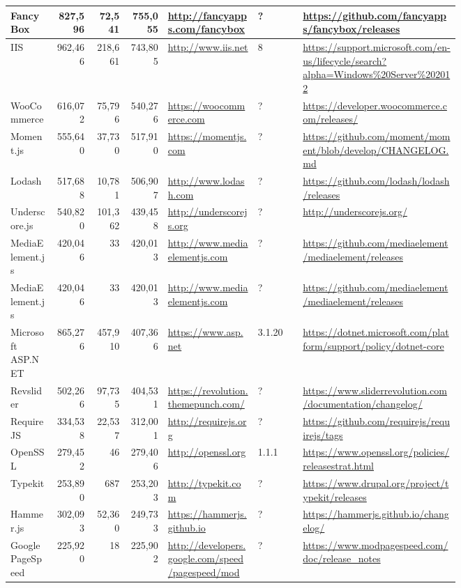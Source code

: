 \begin{landscape}
\begin{longtable}{|p{0.1\linewidth}|r|r|r|p{0.2\linewidth}|p{0.1\linewidth}|p{0.35\linewidth}|}
		FancyBox &827,596 &72,541 &755,055 &\url{http://fancyapps.com/fancybox} &? &\url{https://github.com/fancyapps/fancybox/releases} \\\hline
		IIS &962,466 &218,661 &743,805 &\url{http://www.iis.net} &8 &\url{https://support.microsoft.com/en-us/lifecycle/search?alpha=Windows\%20Server\%202012} \\\hline
		WooCommerce &616,072 &75,796 &540,276 &\url{https://woocommerce.com} &? &\url{https://developer.woocommerce.com/releases/} \\\hline
		Moment.js &555,640 &37,730 &517,910 &\url{https://momentjs.com} &? &\url{https://github.com/moment/moment/blob/develop/CHANGELOG.md} \\\hline
		Lodash &517,688 &10,781 &506,907 &\url{http://www.lodash.com} &? &\url{https://github.com/lodash/lodash/releases} \\\hline
		Underscore.js &540,820 &101,362 &439,458 &\url{http://underscorejs.org} &? &\url{http://underscorejs.org/} \\\hline
		MediaElement.js &420,046 &33 &420,013 &\url{http://www.mediaelementjs.com} &? &\url{https://github.com/mediaelement/mediaelement/releases} \\\hline
		MediaElement.js &420,046 &33 &420,013 &\url{http://www.mediaelementjs.com} &? &\url{https://github.com/mediaelement/mediaelement/releases} \\\hline
		Microsoft ASP.NET &865,276 &457,910 &407,366 &\url{https://www.asp.net} &3.1.20 &\url{https://dotnet.microsoft.com/platform/support/policy/dotnet-core} \\\hline
		Revslider &502,266 &97,735 &404,531 &\url{https://revolution.themepunch.com/} &? &\url{https://www.sliderrevolution.com/documentation/changelog/} \\\hline
		RequireJS &334,538 &22,537 &312,001 &\url{http://requirejs.org} &? &\url{https://github.com/requirejs/requirejs/tags} \\\hline
		OpenSSL &279,452 &46 &279,406 &\url{http://openssl.org} &1.1.1 &\url{https://www.openssl.org/policies/releasestrat.html} \\\hline
		Typekit &253,890 &687 &253,203 &\url{http://typekit.com} &? &\url{https://www.drupal.org/project/typekit/releases} \\\hline
		Hammer.js &302,093 &52,360 &249,733 &\url{https://hammerjs.github.io} &? &\url{https://hammerjs.github.io/changelog/} \\\hline
		Google PageSpeed &225,920 &18 &225,902 &\url{http://developers.google.com/speed/pagespeed/mod} &? &\url{https://www.modpagespeed.com/doc/release\_notes} \\\hline

\end{longtable}
\end{landscape}
